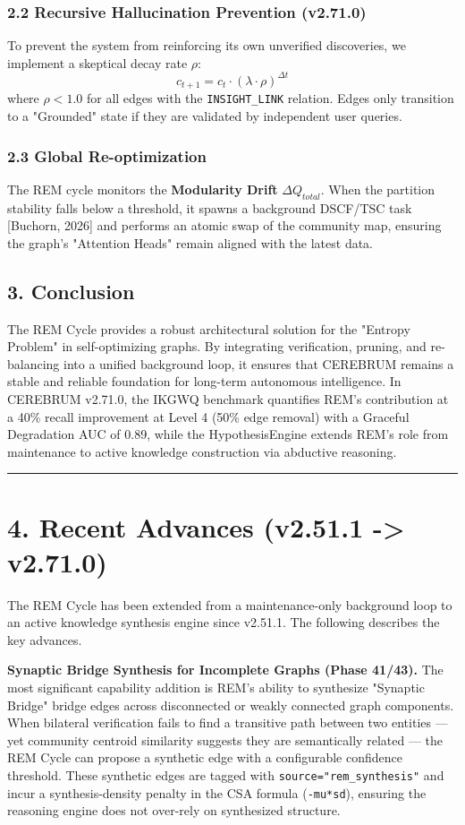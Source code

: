 \subsubsection*{2.2 Recursive Hallucination Prevention (v2.71.0)}
To prevent the system from reinforcing its own unverified discoveries, we implement a skeptical decay rate $\rho$:
$$c_{t+1} = c_t \cdot (\lambda \cdot \rho)^{\Delta t}$$
where $\rho < 1.0$ for all edges with the \texttt{INSIGHT\_LINK} relation. Edges only transition to a "Grounded" state if they are validated by independent user queries.

\subsubsection*{2.3 Global Re-optimization}
The REM cycle monitors the \textbf{Modularity Drift} $\Delta Q_{total}$. When the partition stability falls below a threshold, it spawns a background DSCF/TSC task [Buchorn, 2026] and performs an atomic swap of the community map, ensuring the graph's "Attention Heads" remain aligned with the latest data.

\subsection*{3. Conclusion}
The REM Cycle provides a robust architectural solution for the "Entropy Problem" in self-optimizing graphs. By integrating verification, pruning, and re-balancing into a unified background loop, it ensures that CEREBRUM remains a stable and reliable foundation for long-term autonomous intelligence. In CEREBRUM v2.71.0, the IKGWQ benchmark quantifies REM's contribution at a 40\% recall improvement at Level 4 (50\% edge removal) with a Graceful Degradation AUC of 0.89, while the HypothesisEngine extends REM's role from maintenance to active knowledge construction via abductive reasoning.

\medskip\noindent\rule{\linewidth}{0.4pt}\medskip

\section*{4. Recent Advances (v2.51.1 -> v2.71.0)}

The REM Cycle has been extended from a maintenance-only background loop to an active knowledge synthesis engine since v2.51.1. The following describes the key advances.

\textbf{Synaptic Bridge Synthesis for Incomplete Graphs (Phase 41/43).} The most significant capability addition is REM's ability to synthesize "Synaptic Bridge" bridge edges across disconnected or weakly connected graph components. When bilateral verification fails to find a transitive path between two entities --- yet community centroid similarity suggests they are semantically related --- the REM Cycle can propose a synthetic edge with a configurable confidence threshold. These synthetic edges are tagged with \texttt{source="rem\_synthesis"} and incur a synthesis-density penalty in the CSA formula (\texttt{-mu*sd}), ensuring the reasoning engine does not over-rely on synthesized structure.

